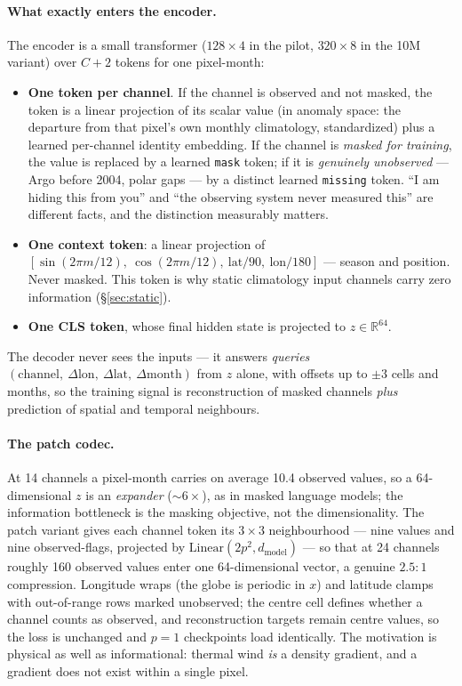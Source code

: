 \documentclass[10pt]{article}
\begin{document}
\paragraph{What exactly enters the encoder.} The encoder is a small
transformer ($128\times4$ in the pilot, $320\times8$ in the 10M
variant) over $C{+}2$ tokens for one pixel-month:
\begin{itemize}\itemsep1pt
\item \textbf{One token per channel}. If the channel is observed and not
  masked, the token is a linear projection of its scalar value (in
  anomaly space: the departure from that pixel's own monthly
  climatology, standardized) plus a learned per-channel identity
  embedding. If the channel is \emph{masked for training}, the value is
  replaced by a learned \texttt{mask} token; if it is \emph{genuinely
  unobserved} --- Argo before 2004, polar gaps --- by a distinct learned
  \texttt{missing} token. ``I am hiding this from you'' and ``the
  observing system never measured this'' are different facts, and the
  distinction measurably matters.
\item \textbf{One context token}: a linear projection of
  $[\sin(2\pi m/12),\ \cos(2\pi m/12),\ \mathrm{lat}/90,\
  \mathrm{lon}/180]$ --- season and position. Never masked. This token
  is why static climatology input channels carry zero information
  (\S\ref{sec:static}).
\item \textbf{One CLS token}, whose final hidden state is projected to
  $z\in\mathbb{R}^{64}$.
\end{itemize}
The decoder never sees the inputs --- it answers \emph{queries}
$(\text{channel},\ \Delta\mathrm{lon},\ \Delta\mathrm{lat},\
\Delta\mathrm{month})$ from $z$ alone, with offsets up to $\pm3$ cells
and months, so the training signal is reconstruction of masked
channels \emph{plus} prediction of spatial and temporal neighbours.

\paragraph{The patch codec.} At 14 channels a pixel-month carries on
average 10.4 observed values, so a 64-dimensional $z$ is an
\emph{expander} ($\sim6\times$), as in masked language models; the
information bottleneck is the masking objective, not the dimensionality.
The patch variant gives each channel token its $3\times3$ neighbourhood
--- nine values and nine observed-flags, projected by
$\mathrm{Linear}(2p^2, d_{\mathrm{model}})$ --- so that at 24 channels
roughly 160 observed values enter one 64-dimensional vector, a genuine
$2.5{:}1$ compression. Longitude wraps (the globe is periodic in $x$)
and latitude clamps with out-of-range rows marked unobserved; the
centre cell defines whether a channel counts as observed, and
reconstruction targets remain centre values, so the loss is unchanged
and $p{=}1$ checkpoints load identically. The motivation is physical as
well as informational: thermal wind \emph{is} a density gradient, and a
gradient does not exist within a single pixel.
\end{document}
